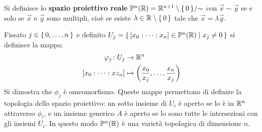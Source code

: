 \begin{definition}
  Si definisce lo \textbf{spazio proiettivo reale}
  $ \mathbb{P}^{n} (\mathbb{R})= {\mathbb{R}^{n+1} \setminus \set{0}} \slash {\sim} $ con
  $ \vec{x} \sim \vec{y} $ se e solo se $ \vec{x} $ e $ \vec{y} $ sono multipli,
  cioè se esiste $ \lambda \in \mathbb{R}^{} \setminus \set{0} $ tale che $ \vec{x} = \lambda \vec{y} $.
\end{definition}
Fissato $ j \in \set{0, \dots, n} $ e definito
$ U_j = \set{[x_0 : \dots : x_n] \in \mathbb{P}^{n} (\mathbb{R}) | x_j \not = 0 } $ si definisce la mappa:
\begin{align*}
  \varphi_j \colon U_j & \to \mathbb{R}^{n} \\
  [x_0 : \dots : xz_n] & \mapsto \left(\frac{x_0}{x_j}, \dots, \frac{x_n}{x_j}\right)
\end{align*}
Si dimostra che $ \phi_j $ è omeomorfismo. Queste mappe permettono di definire la
topologia dello spazio proiettivo: un sotto insieme di $ U_i $ è aperto se lo è
in $ \mathbb{R}^{n} $ attraverso $ \phi_i $, e un insieme generico $ A $ è aperto se lo
sono tutte le intersezioni con gli insiemi $ U_i $. In questo modo $ \mathbb{P}^{n} (\mathbb{R}) $ è
una varietà topologica di dimensione $ n $.

